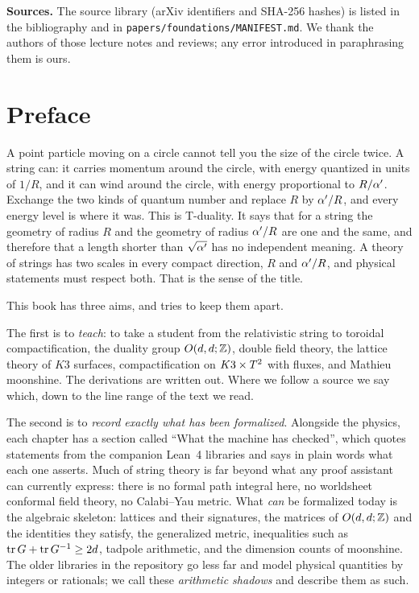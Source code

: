 \medskip\noindent\textbf{Sources.}
The source library (arXiv identifiers and SHA-256 hashes) is listed in the bibliography and in
\texttt{papers/foundations/MANIFEST.md}. We thank the authors of those lecture notes and reviews; any
error introduced in paraphrasing them is ours.
\vspace*{\fill}
\clearpage

\chapter*{Preface}

A point particle moving on a circle cannot tell you the size of the circle twice. A string can: it carries
momentum around the circle, with energy quantized in units of $1/R$, and it can wind around the circle,
with energy proportional to $R/\alpha'$. Exchange the two kinds of quantum number and replace $R$ by $\alpha'/R$,
and every energy level is where it was. This is T-duality. It says that for a string the geometry of
radius $R$ and the geometry of radius $\alpha'/R$ are one and the same, and therefore that a length shorter
than $\sqrt{\alpha'}$ has no independent meaning. A theory of strings has two scales in every compact
direction, $R$ and $\alpha'/R$, and physical statements must respect both. That is the sense of the title.

This book has three aims, and tries to keep them apart.

The first is to \emph{teach}: to take a student from the relativistic string to toroidal
compactification, the duality group $O(d,d;\mathbb{Z})$, double field theory, the lattice theory of $K3$ surfaces,
compactification on $K3\times T^2$ with fluxes, and Mathieu moonshine. The derivations are written out. Where we
follow a source we say which, down to the line range of the text we read.

The second is to \emph{record exactly what has been formalized}. Alongside the physics, each chapter has a
section called ``What the machine has checked'', which quotes statements from the companion Lean~4
libraries and says in plain words what each one asserts. Much of string theory is far beyond what any
proof assistant can currently express: there is no formal path integral here, no worldsheet conformal
field theory, no Calabi--Yau metric. What \emph{can} be formalized today is the algebraic skeleton:
lattices and their signatures, the matrices of $O(d,d;\mathbb{Z})$ and the identities they satisfy, the generalized
metric, inequalities such as $\operatorname{tr} G+\operatorname{tr} G^{-1}\ge 2d$, tadpole arithmetic, and the dimension counts of
moonshine. The older libraries in the repository go less far and model physical quantities by integers or
rationals; we call these \emph{arithmetic shadows} and describe them as such.

